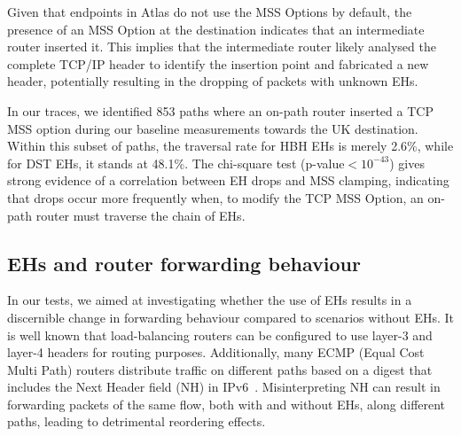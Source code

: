 \documentclass[conference]{IEEEtran}
\begin{document}
Given that endpoints in Atlas do not use the MSS Options by default, the
presence of an MSS Option at the destination indicates that an intermediate
router inserted it. This implies that the intermediate router likely analysed
the complete TCP/IP header to identify the insertion point and fabricated a new
header, potentially resulting in the dropping of packets with unknown EHs.



In our traces, we identified 853 paths where an on-path router inserted a TCP
MSS option during our baseline measurements towards the UK destination. Within
this subset of paths, the traversal rate for HBH EHs is merely 2.6\%, while for
DST EHs, it stands at 48.1\%. The chi-square test (p-value$<10^{-43}$) gives
strong evidence of a correlation between EH drops and MSS clamping, indicating
that drops occur more frequently when, to modify the TCP MSS Option, an on-path
router must traverse the chain of EHs. 




\subsection{EHs and router forwarding behaviour}

In our tests, we aimed at investigating whether the use of EHs results in a
discernible change in forwarding behaviour compared to scenarios without EHs.
It is well known that load-balancing routers can be configured to use
layer-3 and layer-4 headers for routing purposes. Additionally, many ECMP
(Equal Cost Multi Path) routers distribute traffic on different paths based on
a digest that includes the Next Header field (NH) in
IPv6~\cite{lb-classification}.  Misinterpreting NH can result in forwarding
packets of the same flow, both with and without EHs, along different paths,
leading to detrimental reordering effects.
\end{document}
